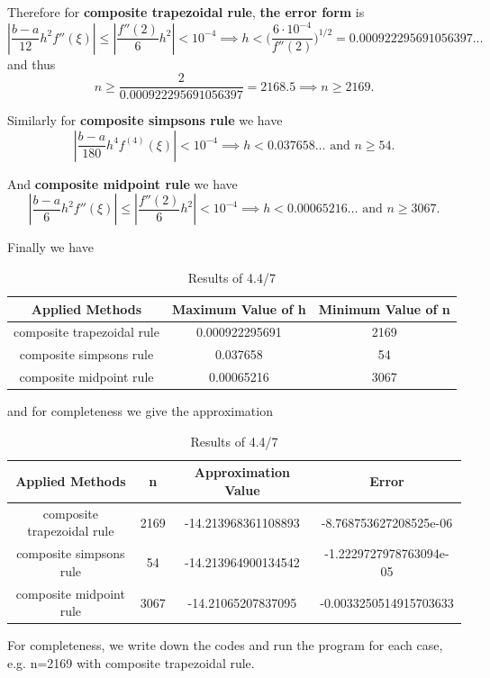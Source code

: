 \documentclass{article}
\begin{document}
    Therefore for \textbf{composite trapezoidal rule}, \textbf{the error form} is 
    $$ |\frac{b-a}{12}h^2f''(\xi)|\leq |\frac{f''(2)}{6}h^2|<10^{-4}\implies h<\big(\frac{6\cdot 10^{-4}}{f''(2)}\big)^{1/2}=0.000922295691056397\ldots
    $$
    and thus 
    $$ n\geq \frac{2}{0.000922295691056397}=2168.5 \implies n\geq 2169.
    $$

    Similarly for \textbf{composite simpsons rule} we have
    $$ |\frac{b-a}{180}h^4f^{(4)}(\xi)|<10^{-4}
    \implies h<0.037658\ldots \text{ and } n\geq 54.
    $$

    And \textbf{composite midpoint rule} we have
    $$ |\frac{b-a}{6}h^2f''(\xi)|\leq |\frac{f''(2)}{6}h^2|<10^{-4}\implies h<0.00065216\ldots \text{ and } n\geq 3067.
    $$

    Finally we have 
    \begin{table}[htbp]
    \centering
    \caption{Results of 4.4/7}
    \begin{tabular}{c|c|c}
    \toprule
    \textbf{Applied Methods} & \textbf{Maximum Value of h} & \textbf{Minimum Value of n} \\ 
    \midrule
    composite trapezoidal rule & 0.000922295691 & 2169 \\
    composite simpsons rule & 0.037658 & 54 \\
    composite midpoint rule &  0.00065216 & 3067 \\
    \bottomrule
    \end{tabular}
    \end{table}

    and for completeness we give the approximation 
    \begin{table}[htbp]
    \centering
    \caption{Results of 4.4/7}
    \begin{tabular}{c|c|c|c}
    \toprule
    \textbf{Applied Methods} & \textbf{n} & \textbf{Approximation Value } & \textbf{Error}\\ 
    \midrule
    composite trapezoidal rule & 2169 & -14.213968361108893 &-8.768753627208525e-06 \\
    composite simpsons rule & 54  &-14.213964900134542 &-1.2229727978763094e-05\\
    composite midpoint rule &  3067  &-14.21065207837095 &-0.0033250514915703633\\ 
    \bottomrule
    \end{tabular}
    \end{table}

    For completeness, we write down the codes and run the program for each case, e.g. n=2169 with composite trapezoidal rule.
\end{document}
